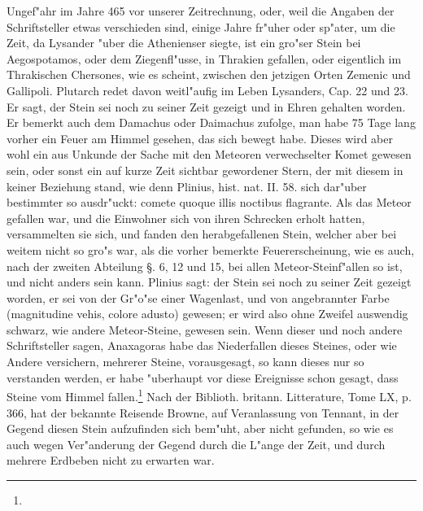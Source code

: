 \documentclass[a4paper, 11pt, oneside, polutonikogreek, german]{article}
\begin{document}
Ungef"ahr im Jahre 465 vor unserer Zeitrechnung, oder, weil die Angaben der Schriftsteller etwas verschieden sind, einige Jahre fr"uher oder sp"ater, um die Zeit, da Lysander "uber die Athenienser siegte, ist ein gro"ser Stein bei Aegospotamos, oder dem Ziegenfl"usse, in Thrakien gefallen, oder eigentlich im Thrakischen Chersones, wie es scheint, zwischen den jetzigen Orten Zemenic und Gallipoli. Plutarch redet davon weitl"aufig im Leben Lysanders, Cap. 22 und 23. Er sagt, der Stein sei noch zu seiner Zeit gezeigt und in Ehren gehalten worden. Er bemerkt auch dem Damachus oder Daimachus zufolge, man habe 75 Tage lang vorher ein Feuer am Himmel gesehen, das sich bewegt habe. Dieses wird aber wohl ein aus Unkunde der Sache mit den Meteoren verwechselter Komet gewesen sein, oder sonst ein auf kurze Zeit sichtbar gewordener Stern, der mit diesem in keiner Beziehung stand, wie denn Plinius, hist. nat. II. 58. sich dar"uber bestimmter so ausdr"uckt: comete quoque illis noctibus flagrante. Als das Meteor gefallen war, und die Einwohner sich von ihren Schrecken erholt hatten, versammelten sie sich, und fanden den herabgefallenen Stein, welcher aber bei weitem nicht so gro"s war, als die vorher bemerkte Feuererscheinung, wie es auch, nach der zweiten Abteilung §. 6, 12 und 15, bei allen Meteor-Steinf"allen so ist, und nicht anders sein kann. Plinius sagt: der Stein sei noch zu seiner Zeit gezeigt worden, er sei von der Gr"o"se einer Wagenlast, und von angebrannter Farbe (magnitudine vehis, colore adusto) gewesen; er wird also ohne Zweifel auswendig schwarz, wie andere Meteor-Steine, gewesen sein. Wenn dieser und noch andere Schriftsteller sagen, Anaxagoras habe das Niederfallen dieses Steines, oder wie Andere versichern, mehrerer Steine, vorausgesagt, so kann dieses nur so verstanden werden, er habe "uberhaupt vor diese Ereignisse schon gesagt, dass Steine vom Himmel fallen.\footnote{} Nach der Biblioth. britann. Litterature, Tome LX, p. 366, hat der bekannte Reisende Browne, auf Veranlassung von Tennant, in der Gegend diesen Stein aufzufinden sich bem"uht, aber nicht gefunden, so wie es auch wegen Ver"anderung der Gegend durch die L"ange der Zeit, und durch mehrere Erdbeben nicht zu erwarten war.
\end{document}
